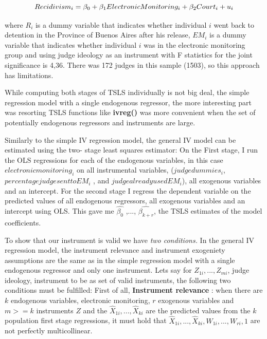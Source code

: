 \documentclass[a4paper,12pt]{article}
\begin{document}
\begin{equation}
    \centering
    Recidivism_i = \beta_0 + \beta_1Electronic Monitoring_i + \beta_2Court_i + u_i  
\end{equation}

where $R_i$ is a dummy variable that indicates whether individual $i$ went back to detention in the Province of Buenos Aires after his release, $EM_i$ is a dummy variable that indicates whether individual $i$ was in the electronic monitoring group and using judge ideology as an instrument with F statistics for the joint significance is 4,36. There was 172 judges in this sample (1503), so this approach has limitations. 

While computing both stages of TSLS individually is not big deal, the simple regression model with a single endogenous regressor, the more interesting part was resorting TSLS functions like \textbf{ivreg()} was more convenient when the set of potentially endogenous regressors and instruments are large. 

Similarly to the simple IV regression model, the general IV model can be estimated using the two- stage least squares estimator: On the First stage, I run the OLS regressions for each of the endogenous variables, in this case $electronic monitoring_i$ on all instrumental variables, ($judge dummies_i$, $percentage judge sent to EM_i$ , and $judge already used EM_i$), all exogenous variables and an intercept. For the second stage I regress the dependent variable on the predicted values of all endogenous regressors, all exogenous variables and an intercept using OLS. This gave me $\widehat{\beta_0}$ ,..., $\widehat{\beta_{k+r}}$, the TSLS estimates of the model coefficients. 

To show that our instrument is valid we have\textit{ two conditions.} In the general IV regression model, the instrument relevance and instrument exogeniety assumptions are the same as in the simple regression model with a single endogenous regressor and only one instrument. Lets say for $Z_{1i},...,Z_{mi}$, judge ideology, instrument to be as set of valid instruments, the following two conditions must be fulfilled: First of all, \textbf{Instrument relevance} : when there are $k$ endogenous variables, electronic monitoring, $r$ exogenous variables and $m >= k$ instruments $Z$ and the $\widehat{X}_{1i} ,..., \widehat{X}_{ki}$ are the predicted values from the  $k$ population first stage regressions, it must hold that $\widehat{X}_{1i} ,..., \widehat{X}_{ki}, W_{1i},...,W_{ri}, 1$ are not perfectly multicollinear. 
\end{document}
